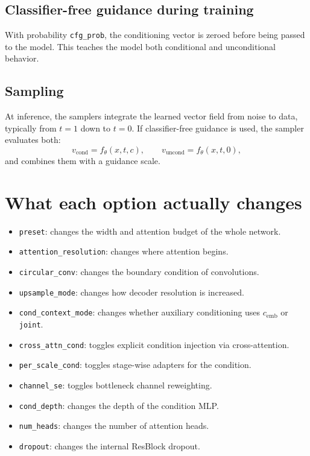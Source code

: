\documentclass[11pt]{article}
\begin{document}
\subsection{Classifier-free guidance during training}
With probability \texttt{cfg\_prob}, the conditioning vector is zeroed before being passed to the model. This teaches the model both conditional and unconditional behavior.

\subsection{Sampling}
At inference, the samplers integrate the learned vector field from noise to data, typically from $t=1$ down to $t=0$. If classifier-free guidance is used, the sampler evaluates both:
\[
v_{\mathrm{cond}} = f_\theta(x,t,c), \qquad v_{\mathrm{uncond}} = f_\theta(x,t,0),
\]
and combines them with a guidance scale.

\section{What each option actually changes}
\begin{itemize}
  \item \texttt{preset}: changes the width and attention budget of the whole network.
  \item \texttt{attention\_resolution}: changes where attention begins.
  \item \texttt{circular\_conv}: changes the boundary condition of convolutions.
  \item \texttt{upsample\_mode}: changes how decoder resolution is increased.
  \item \texttt{cond\_context\_mode}: changes whether auxiliary conditioning uses $c_{\mathrm{emb}}$ or \texttt{joint}.
  \item \texttt{cross\_attn\_cond}: toggles explicit condition injection via cross-attention.
  \item \texttt{per\_scale\_cond}: toggles stage-wise adapters for the condition.
  \item \texttt{channel\_se}: toggles bottleneck channel reweighting.
  \item \texttt{cond\_depth}: changes the depth of the condition MLP.
  \item \texttt{num\_heads}: changes the number of attention heads.
  \item \texttt{dropout}: changes the internal ResBlock dropout.
\end{itemize}
\end{document}
